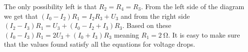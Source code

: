 {The only possibility left is that $R_2=R_4=R_3$. From the left side of the diagram we get that $(I_0-I_2)R_1=I_2R_3+U_3$ and from the right side $(I_2-I_3)R_1=U_3+(I_0-I_2+I_3)R_3$. Based on these $(I_0-I_3)R_1=2U_3+(I_0+I_3)R_3$ meaning $R_1=\SI{2}{\ohm}$. It is easy to make sure that the values found satisfy all the equations for voltage drops.
\fi
}